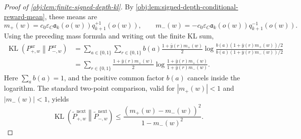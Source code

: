 \documentclass[11pt]{article}
\begin{document}
\begin{proof}[Proof of \cref{obj:lem:finite-signed-depth-kl}]
By \cref{obj:lem:signed-depth-conditional-reward-mean}, these means are
\[
m_+(w)=c_0\varepsilon_C\mathfrak a_k(o(w))q_{k+1}^{+1}(o(w)),
\qquad
m_-(w)=-c_0\varepsilon_C\mathfrak a_k(o(w))q_{k+1}^{-1}(o(w)).
\]
Using the preceding mass formula and writing out the finite KL sum,
\[
\begin{aligned}
\operatorname{KL}\!\left(P_{+,w}^{\mathrm{ar}}\middle\|P_{-,w}^{\mathrm{ar}}\right)
&=
\sum_{a\in\{0,1\}}\sum_{r\in\{0,1\}}
 b(a)\frac{1+\bar y(r)m_+(w)}{2}
\log\frac{b(a)(1+\bar y(r)m_+(w))/2}{b(a)(1+\bar y(r)m_-(w))/2} \\
&=
\sum_{r\in\{0,1\}}
\frac{1+\bar y(r)m_+(w)}{2}
\log\frac{1+\bar y(r)m_+(w)}{1+\bar y(r)m_-(w)}.
\end{aligned}
\]
Here \(\sum_a b(a)=1\), and the positive common factor \(b(a)\) cancels inside the logarithm.  The standard two-point comparison, valid for \(|m_+(w)|<1\) and \(|m_-(w)|<1\), yields
\[
\operatorname{KL}\!\left(\widetilde P_{+,w}^{\mathrm{next}}\middle\|\widetilde P_{-,w}^{\mathrm{next}}\right)
\le
\frac{(m_+(w)-m_-(w))^2}{1-m_-(w)^2}.
\] %


\end{proof}
\end{document}
